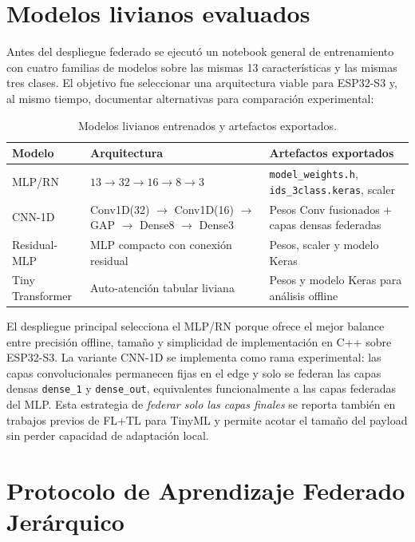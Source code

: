 \section{Modelos livianos evaluados}
\label{sec:modelos_livianos}

Antes del despliegue federado se ejecutó un notebook general de entrenamiento con cuatro familias de modelos sobre las mismas 13 características y las mismas tres clases. El objetivo fue seleccionar una arquitectura viable para ESP32-S3 y, al mismo tiempo, documentar alternativas para comparación experimental:

\begin{table}[H]
\centering
\caption{Modelos livianos entrenados y artefactos exportados.}
\label{tab:modelos_livianos}
\small
\begin{tabular}{l >{\raggedright\arraybackslash}p{5cm}>{\raggedright\arraybackslash}p{4cm}}
\toprule
\textbf{Modelo} & \textbf{Arquitectura} & \textbf{Artefactos exportados} \\
\midrule
MLP/RN & $13 \to 32 \to 16 \to 8 \to 3$ & \texttt{model\_weights.h}, \texttt{ids\_3class.keras}, scaler \\
CNN-1D & Conv1D(32) $\to$ Conv1D(16) $\to$ GAP $\to$ Dense8 $\to$ Dense3 & Pesos Conv fusionados + capas densas federadas \\
Residual-MLP & MLP compacto con conexión residual & Pesos, scaler y modelo Keras \\
Tiny Transformer & Auto-atención tabular liviana & Pesos y modelo Keras para análisis offline \\
\bottomrule
\end{tabular}
\end{table}

El despliegue principal selecciona el MLP/RN porque ofrece el mejor balance entre precisión offline, tamaño y simplicidad de implementación en C++ sobre ESP32-S3. La variante CNN-1D se implementa como rama experimental: las capas convolucionales permanecen fijas en el edge y solo se federan las capas densas \texttt{dense\_1} y \texttt{dense\_out}, equivalentes funcionalmente a las capas federadas del MLP. Esta estrategia de \emph{federar solo las capas finales} se reporta también en trabajos previos de FL+TL para TinyML \cite{Ficco2024_FL_TinyML_Onboard, Roy2023_FL_AdaptedModel} y permite acotar el tamaño del payload sin perder capacidad de adaptación local.

\section{Protocolo de Aprendizaje Federado Jerárquico}
\label{sec:fedavg}


